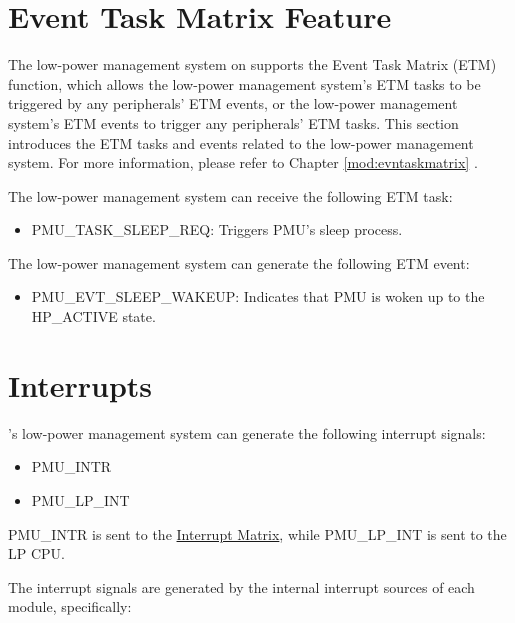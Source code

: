 \documentclass[main\_\_EN.tex]{subfiles}
\begin{document}

\section{Event Task Matrix Feature}
\label{sec:lowpowm-etm-func}

The low-power management system on \chipname{} supports the Event Task Matrix (ETM) function, which allows the low-power management system's ETM tasks to be triggered by any peripherals' ETM events, or the low-power management system's ETM events to trigger any peripherals' ETM tasks. This section introduces the ETM tasks and events related to the low-power management system. For more information, please refer to Chapter \ref{mod:evntaskmatrix} .

The low-power management system can receive the following ETM task:

\begin{itemize}
\item PMU\_TASK\_SLEEP\_REQ: Triggers PMU's sleep process.
\end{itemize}

The low-power management system can generate the following ETM event:

\begin{itemize}
\item PMU\_EVT\_SLEEP\_WAKEUP: Indicates that PMU is woken up to the HP\_ACTIVE state.
\end{itemize}


\section{Interrupts}

\chipname{}'s low-power management system can generate the following interrupt signals:

\begin{itemize}
    \item PMU\_INTR
    \item PMU\_LP\_INT
\end{itemize}

PMU\_INTR is sent to the \hyperref[mod:intmtrx]{Interrupt Matrix}, while PMU\_LP\_INT is sent to the LP CPU.

The interrupt signals are generated by the internal interrupt sources of each module, specifically:
\end{document}
